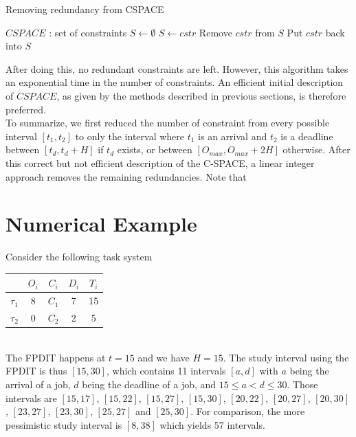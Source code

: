 \documentclass[times, 10pt,twocolumn, a4paper]{article}
\begin{document}
\begin{algorithm}
\caption{Removing redundancy from CSPACE}
\label{alg:prunRedun}
	\begin{algorithmic}[1]
		\STATE $CSPACE$ : set of constraints
		\STATE $S \leftarrow \emptyset$
		\STATE {}
				\STATE $S \leftarrow cstr$
			\ENDIF
		\ENDFOR
		\STATE {}
			\STATE Remove $cstr$ from $S$
				\STATE Put $cstr$ back into $S$
			\ENDIF
		\ENDFOR
	\end{algorithmic}
\end{algorithm}

After doing this, no redundant constraints are left. However, this algorithm takes an exponential time in the number of constraints. An efficient initial description of $CSPACE$, as given by the methods described in previous sections, is therefore preferred.\\

To summarize, we first reduced the number of constraint from every possible interval $[t_1, t_2]$ to only the interval where $t_1$ is an arrival and $t_2$ is a deadline between $[t_d, t_d + H]$ if $t_d$ exists, or between $[O_{max}, O_{max} + 2H]$ otherwise. After this correct but not efficient description of the C-SPACE, a linear integer approach removes the remaining redundancies. Note that

\section{Numerical Example}

Consider the following task system

		\begin{center}
		\begin{tabular}{|r|c|c|c|c|}
		 \hline
		  & $O_i$ & $C_i$ & $D_i$ & $T_i$ \\
		 \hline
		 $\tau_1$ & 8 & $C_1$ & 7 & 15\\
		 \hline
		 $\tau_2$ & 0 & $C_2$ & 2 & 5\\
		 \hline
		\end{tabular}
		\end{center}
		~\\

The FPDIT happens at $t=15$ and we have $H = 15$. The study interval using the FPDIT is thus $[15, 30]$, which contains 11 intervals $[a,d]$ with $a$ being the arrival of a job, $d$ being the deadline of a job, and $15 \leqslant a < d \leqslant 30$. Those intervals are
$[15, 17]$, $[15, 22]$, $[15, 27]$, $[15, 30]$, $[20, 22]$, $[20, 27]$, $[20, 30]$, $[23, 27]$, $[23, 30]$, $[25, 27]$ and $[25, 30]$. For comparison, the more pessimistic study interval is $[8, 38]$ which yields 57 intervals.\\
\end{document}
